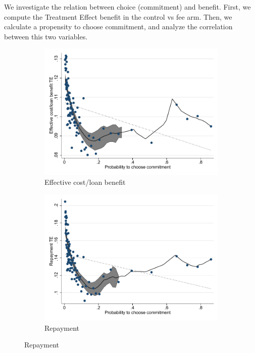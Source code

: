 \documentclass[oneside,11pt]{article}
\begin{document}
We investigate the relation between choice (commitment) and benefit. First, we compute the Treatment Effect benefit in the control vs fee arm. Then, we calculate a propensity to choose commitment, and analyze the correlation between this two variables. 




\begin{figure}[H]
    \caption{}
    \label{}
    \begin{center}
    \begin{subfigure}{0.475\textwidth}
        \caption{Effective cost/loan benefit}
        \centering
        \includegraphics[width=\textwidth]{Figuras/benefit_choice.pdf}
    \end{subfigure}
    \begin{subfigure}{0.475\textwidth}
        \caption{Repayment}
        \centering
        \includegraphics[width=\textwidth]{Figuras/benefit_choice_des.pdf}
    \end{subfigure}
  

\end{center}
\end{figure}
\end{document}
